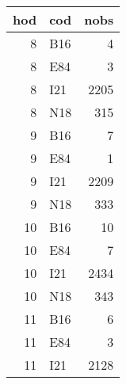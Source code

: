 \begin{tabular}{rlr}
  \toprule
 hod & cod & nobs \\ 
  \midrule
    8 & B16 &   4 \\ 
    8 & E84 &   3 \\ 
    8 & I21 & 2205 \\ 
    8 & N18 & 315 \\ 
    9 & B16 &   7 \\ 
    9 & E84 &   1 \\ 
    9 & I21 & 2209 \\ 
    9 & N18 & 333 \\ 
   10 & B16 &  10 \\ 
   10 & E84 &   7 \\ 
   10 & I21 & 2434 \\ 
   10 & N18 & 343 \\ 
   11 & B16 &   6 \\ 
   11 & E84 &   3 \\ 
   11 & I21 & 2128 \\ 
   \bottomrule
\end{tabular}
